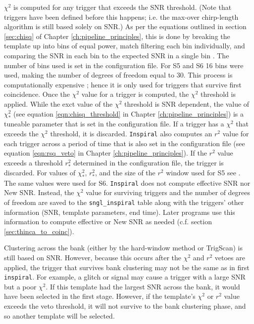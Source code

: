 $\chi^2$ is computed for any trigger that exceeds the \ac{SNR} threshold. (Note
that triggers have been defined before this happens; i.e. the max-over
chirp-length algorithm is still based solely on \ac{SNR}.) As per the equations
outlined in section \ref{sec:chisq} of Chapter \ref{ch:pipeline_principles},
this is done by breaking the template up into bins of equal power, match
filtering each bin individually, and comparing the \ac{SNR} in each bin to the
expected \ac{SNR} in a single bin \cite{Allen:2004, Allen:2005fk}. The number
of bins used is set in the configuration file. For \ac{S5} and \ac{S6} 16 bins
were used, making the number of degrees of freedom equal to 30. This process is
computationally expensive \cite{Allen:2005fk}; hence it is only used for
triggers that survive first coincidence. Once the $\chi^2$ value for a trigger
is computed, the $\chi^2$ threshold is applied. While the exct value of the
$\chi^2$ threshold is \ac{SNR} dependent, the value of $\chi_*^2$ (see equation
\ref{eqn:chisq_threshold} in Chapter \ref{ch:pipeline_principles}) is a
tuneable parameter \cite{Keppel:thesis} that is set in the configuration file.
If a trigger has a $\chi^2$ that exceeds the $\chi^2$ threshold, it is
discarded. \texttt{Inspiral} also computes an $r^2$ value for each trigger
across a period of time that is also set in the configuration file (see
equation \ref{eqn:rsq_veto} in Chapter \ref{ch:pipeline_principles}). If the
$r^2$ value exceeds a threshold $r_*^2$ determined in the configuration file,
the trigger is discarded. For values of $\chi_*^2$, $r_*^2$, and the size of
the $r^2$ window used for \ac{S5} see \cite{Rodriguez:2007, Keppel:thesis}. The
same values were used for \ac{S6}. \texttt{Inspiral} does not compute effective
\ac{SNR} nor New \ac{SNR}. Instead, the $\chi^2$ value for surviving triggers
and the number of degrees of freedom are saved to the \texttt{sngl\_inspiral}
table along with the triggers' other information (\ac{SNR}, template
parameters, end time). Later programs use this information to compute effective
or New \ac{SNR} as needed (c.f. section \ref{sec:thinca_to_coinc}).

Clustering across the bank (either by the hard-window method or TrigScan) is
still based on \ac{SNR}. However, because this occurs after the $\chi^2$ and
$r^2$ vetoes are applied, the trigger that survives bank clustering may not be
the same as in first \texttt{inspiral}. For example, a glitch or signal may
cause a trigger with a large \ac{SNR} but a poor $\chi^2$. If this template had
the largest \ac{SNR} across the bank, it would have been selected in the first
stage. However, if the template's $\chi^2$ or $r^2$ value exceeds the veto
threshold, it will not survive to the bank clustering phase, and so another
template will be selected. 


